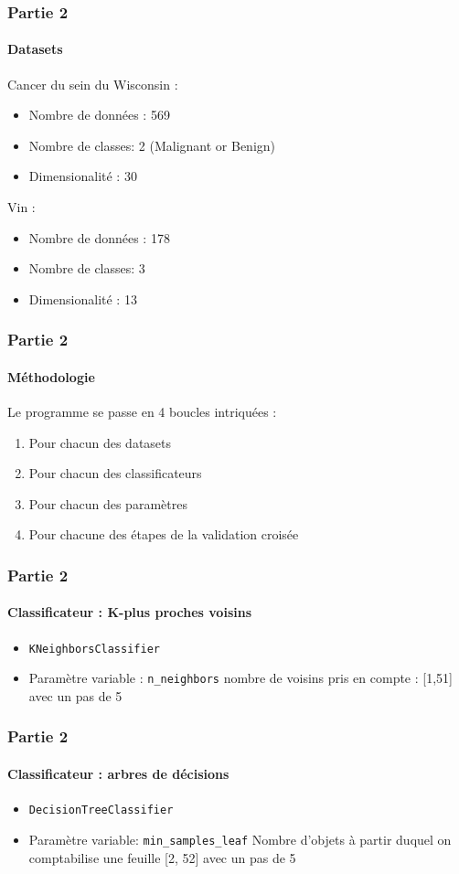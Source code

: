 \documentclass{beamer}
\begin{document}
    \begin{frame}
        \frametitle{Partie 2}
        \framesubtitle{Datasets}
        Cancer du sein du Wisconsin :
        \begin{itemize}
         \item Nombre de données : 569
         \item Nombre de classes: 2 (Malignant or Benign)
         \item Dimensionalité : 30
        \end{itemize}
        Vin :
        \begin{itemize}
         \item Nombre de données : 178
         \item Nombre de classes: 3
         \item Dimensionalité : 13
        \end{itemize}
    \end{frame}
    
    \begin{frame}
        \frametitle{Partie 2}
        \framesubtitle{Méthodologie}
        
        Le programme se passe en 4 boucles intriquées :
        \begin{enumerate}
            \item Pour chacun des datasets
            \item Pour chacun des classificateurs
            \item Pour chacun des paramètres
            \item Pour chacune des étapes de la validation croisée
        \end{enumerate}
    \end{frame}
    
    \begin{frame}[fragile]
        \frametitle{Partie 2}
        \framesubtitle{Classificateur : K-plus proches voisins}
        \begin{itemize}
            \item \verb?KNeighborsClassifier?
            \item Paramètre variable : \verb?n_neighbors? nombre de voisins pris en compte : [1,51] avec un pas de 5
        \end{itemize}
    \end{frame}
    
    \begin{frame}[fragile]
        \frametitle{Partie 2}
        \framesubtitle{Classificateur : arbres de décisions}
        \begin{itemize}
            \item \verb?DecisionTreeClassifier?
            \item Paramètre variable: \verb?min_samples_leaf? Nombre d'objets à partir duquel on comptabilise une feuille [2, 52] avec un pas de 5
        \end{itemize}
    \end{frame}
\end{document}
